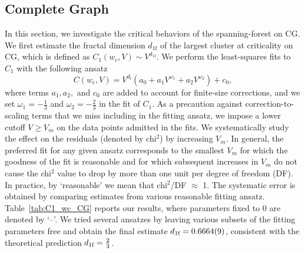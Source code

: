 \subsection{Complete Graph}
In this section, we investigate the critical behaviors of the spanning-forest on CG.
We first estimate the fractal dimension $d_{1 \textrm{f}}$ of the largest cluster at criticality on CG, which is defined as $C_1(w_c, V) \sim V^{d_{1\textrm{f}}}$.
We perform the least-squares fits to $C_1$ with the following ansatz
\begin{equation}\label{eq:C1_ansatz_CG}
    C(w_c, V) = V^{d_{\textrm{f}}}(a_0 + a_1V^{\omega_1} +a_2 V^{\omega_2}) + c_0,
\end{equation}
where terms $a_1, a_2,$ and $c_0$ are added to account for finite-size corrections, and we set $\omega_1 = -\frac{1}{3}$ and $\omega_2 = -\frac{2}{3}$ in the fit of $C_1$.
As a precaution against correction-to-scaling terms that we miss including in the fitting ansatz, we impose a lower cutoff $V \geq V_m$ 
on the data points admitted in the fits. We systematically study the effect on the residuals (denoted by chi$^2$) by increasing $V_m$. In general, 
the preferred fit for any given ansatz corresponds to the smallest $V_m$ for which the goodness of the fit is reasonable and for which subsequent 
increases in $V_m$ do not cause the chi$^2$ value to drop by more than one unit per degree of freedom (DF). In practice, by `reasonable' 
we mean that chi$^2$/DF $\approx$ 1. The systematic error is obtained by comparing estimates from various reasonable fitting ansatz.
Table~\ref{tab:C1_wc_CG} reports our results, where parameters fixed to 0 are denoted by `--'. We tried several ansatzes by
leaving various subsets of the fitting parameters free and obtain the final estimate ${d_{1\textrm{f}}} = 0.6664(9)$, consistent with the theoretical 
prediction ${d_{1\textrm{f}}} = \frac{2}{3}$.

